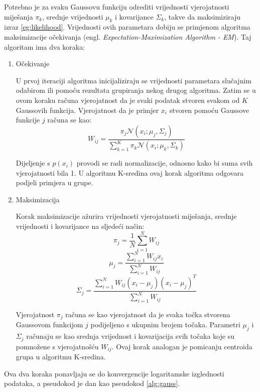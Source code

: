 \documentclass[utf8, diplomski, numeric]{fer}
\begin{document}
Potrebno je za svaku Gaussovu funkciju odrediti vrijednosti vjerojatnosti miješanja $\pi_k$, srednje vrijednosti $\mu_k$ i kovarijance $\Sigma_k$, takve da maksimiziraju izraz \ref{eg:likelihood}. Vrijednosti ovih parametara dobiju se primjenom algoritma maksimizacije očekivanja (engl. \textit{Expectation-Maximization Algorithm - EM}). Taj algoritam ima dva koraka:
\begin{enumerate}
\item Očekivanje

U prvoj iteraciji algoritma inicijaliziraju se vrijednosti parametara slučajnim odabirom ili pomoću rezultata grupiranja nekog drugog algoritma. Zatim se u ovom koraku računa vjerojatnost da je svaki podatak stvoren svakom od $K$ Gaussovih funkcija. Vjerojatnost da je primjer $x_i$ stvoren pomoću Gaussove funkcije $j$ računa se kao:
\begin{equation}\label{eq:expectation}
W_{ij} = \frac{\pi_j \mathcal{N}(x_i;\mu_j,\Sigma_j)}{\sum_{k=1}^{K} \pi_k \mathcal{N}(x_i;\mu_k,\Sigma_k)}
\end{equation}

Dijeljenje s $p(x_i)$ provodi se radi normalizacije, odnosno kako bi suma svih vjerojatnosti bila 1. U algoritmu K-sredina ovaj korak algoritma odgovara podjeli primjera u grupe.
\item Maksimizacija

Korak maksimizacije ažurira vrijednosti vjerojatnosti miješanja, srednje vrijednosti i kovarijance na sljedeći način:
\begin{equation}\label{eq:max}
\pi_j = \frac{1}{N}\sum_{i=1}^{N} W_{ij}
\end{equation}
\begin{equation}\label{eq:max}
\mu_j = \frac{\sum_{i=1}^{N} W_{ij}x_i}{\sum_{i=1}^{N} W_{ij}}
\end{equation}
\begin{equation}\label{eq:max}
\Sigma_j = \frac{\sum_{i=1}^{N} W_{ij}(x_i-\mu_j)(x_i-\mu_j)^T}{\sum_{i=1}^{N} W_{ij}}
\end{equation}

Vjerojatnost $\pi_j$ računa se kao vjerojatnost da je svaka točka stvorena Gaussovom funkcijom $j$ podijeljeno s ukupnim brojem točaka. Parametri $\mu_j$ i $\Sigma_j$ računaju se kao srednja vrijednost i kovarijacija svih točaka koje su pomnožene s vjerojatnošću $W_{ij}$. Ovaj korak analogan je pomicanju centroida grupa u algoritmu K-sredina.
\end{enumerate}

Ova dva koraka ponavljaju se do konvergencije logaritamske izglednosti podataka, a pseudokod je dan kao pseudokod \ref{alg:gauss}. 
\end{document}
